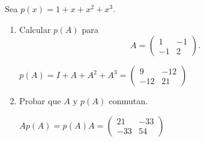 \item Sea $p(x)=1+x+x^2+x^3$.
    \begin{enumerate}
        \item Calcular $p(A)$ para \[A=\begin{pmatrix}
                1&-1\\-1&2
            \end{pmatrix}.\]
            \begin{mdframed}[style=s]
                \begin{center}
                    $p(A)=I+A+A^2+A^3=\begin{pmatrix}
                        9&-12\\-12&21
                    \end{pmatrix}$
                \end{center}
            \end{mdframed}
        \item Probar que $A$ y $p(A)$ conmutan.
            \begin{mdframed}[style=s]
                \begin{center}
                    $Ap(A)=p(A)A=\begin{pmatrix}
                        21&-33\\-33&54
                    \end{pmatrix}$
                \end{center}
            \end{mdframed}
    \end{enumerate}